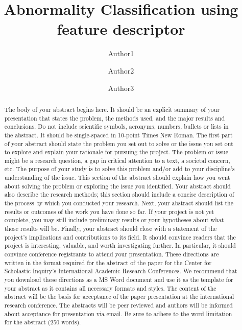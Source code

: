 \documentclass{article}
\author[1]{Author1 \orcidaffil{0000-0000-0000-0000}}
\author[1]{Author2 \orcidaffil{0000-0000-0000-0000}}
\author[2]{Author3 \orcidaffil{0000-0000-0000-0000}}
\affil[1]{Author Affiliation1}
\affil[2]{Author Affiliation2}
\affil[ ]{\textit {\{email1,email2,email3,email4,email5\}@xyz.edu}}
\begin{document}
	\title{Abnormality Classification using feature descriptor}	
	
	\maketitle
	
	\begin{abstract}
		The body of your abstract begins here. It should be an explicit summary of your presentation that
		states the problem, the methods used, and the major results and conclusions. Do not include scientific symbols,
		acronyms, numbers, bullets or lists in the abstract. It should be single-spaced in 10-point Times New Roman.
		The first part of your abstract should state the problem you set out to solve or the issue you set out to explore
		and explain your rationale for pursuing the project. The problem or issue might be a research question, a gap in
		critical attention to a text, a societal concern, etc. The purpose of your study is to solve this problem and/or add
		to your discipline’s understanding of the issue. This section of the abstract should explain how you went about
		solving the problem or exploring the issue you identified. Your abstract should also describe the research
		methods; this section should include a concise description of the process by which you conducted your research.
		Next, your abstract should list the results or outcomes of the work you have done so far. If your project is not
		yet complete, you may still include preliminary results or your hypotheses about what those results will
		be. Finally, your abstract should close with a statement of the project’s implications and contributions to its
		field. It should convince readers that the project is interesting, valuable, and worth investigating further. In
		particular, it should convince conference registrants to attend your presentation. These directions are written in
		the format required for the abstract of the paper for the Center for Scholastic Inquiry’s International Academic
		Research Conferences. We recommend that you download these directions as a MS Word document and use it
		as the template for your abstract as it contains all necessary formats and styles. The content of the abstract will
		be the basis for acceptance of the paper presentation at the international research conference. The abstracts will
		be peer reviewed and authors will be informed about acceptance for presentation via email. Be sure to adhere to
		the word limitation for the abstract (250 words).
	\end{abstract}
	
\end{document}
